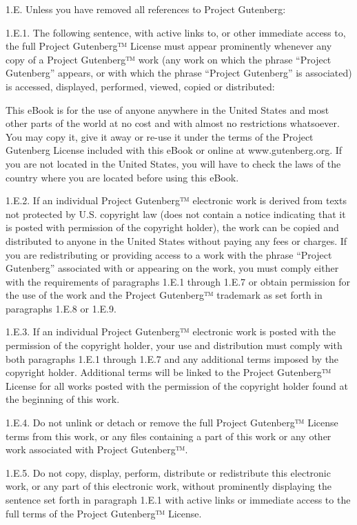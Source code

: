 1.E. Unless you have removed all references to Project Gutenberg:

1.E.1. The following sentence, with active links to, or other
immediate access to, the full Project Gutenberg™ License must appear
prominently whenever any copy of a Project Gutenberg™ work (any work
on which the phrase “Project Gutenberg” appears, or with which the
phrase “Project Gutenberg” is associated) is accessed, displayed,
performed, viewed, copied or distributed:

    This eBook is for the use of anyone anywhere in the United States and most
    other parts of the world at no cost and with almost no restrictions
    whatsoever. You may copy it, give it away or re-use it under the terms
    of the Project Gutenberg License included with this eBook or online
    at www.gutenberg.org. If you
    are not located in the United States, you will have to check the laws
    of the country where you are located before using this eBook.
  
1.E.2. If an individual Project Gutenberg™ electronic work is
derived from texts not protected by U.S. copyright law (does not
contain a notice indicating that it is posted with permission of the
copyright holder), the work can be copied and distributed to anyone in
the United States without paying any fees or charges. If you are
redistributing or providing access to a work with the phrase “Project
Gutenberg” associated with or appearing on the work, you must comply
either with the requirements of paragraphs 1.E.1 through 1.E.7 or
obtain permission for the use of the work and the Project Gutenberg™
trademark as set forth in paragraphs 1.E.8 or 1.E.9.

1.E.3. If an individual Project Gutenberg™ electronic work is posted
with the permission of the copyright holder, your use and distribution
must comply with both paragraphs 1.E.1 through 1.E.7 and any
additional terms imposed by the copyright holder. Additional terms
will be linked to the Project Gutenberg™ License for all works
posted with the permission of the copyright holder found at the
beginning of this work.

1.E.4. Do not unlink or detach or remove the full Project Gutenberg™
License terms from this work, or any files containing a part of this
work or any other work associated with Project Gutenberg™.

1.E.5. Do not copy, display, perform, distribute or redistribute this
electronic work, or any part of this electronic work, without
prominently displaying the sentence set forth in paragraph 1.E.1 with
active links or immediate access to the full terms of the Project
Gutenberg™ License.

